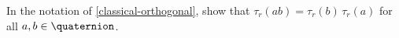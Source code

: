 \begin{exercises}
%
%
%
%

\item \label{tau=Antiaut}
 In the notation of \cref{classical-orthogonal},
show that $\tau_r(ab) = \tau_r(b) \, \tau_r(a)$ for all $a,b \in
\quaternion$.



\end{exercises}

